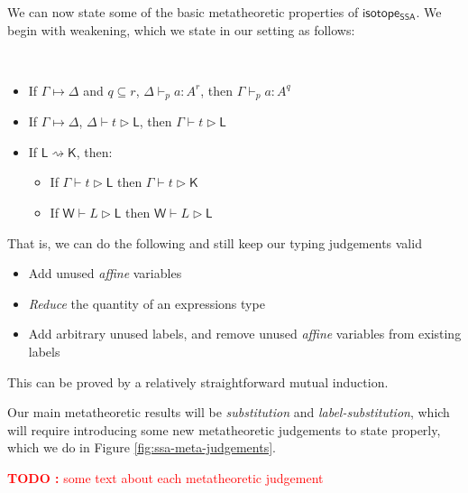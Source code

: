 \documentclass[acmsmall,screen,review]{acmart}
\newcounter{todos}
\newcommand{\TODO}[1]{{
  \stepcounter{todos}
  \begin{center}\large{\textcolor{red}{\textbf{TODO \arabic{todos}:} #1}}\end{center}
}}
\newcommand{\ms}[1]{\ensuremath{\mathsf{#1}}}
\newcommand{\cwk}[2]{#1 \mapsto #2}
\newcommand{\lwk}[2]{#1 \rightsquigarrow #2}
\newcommand{\hasty}[5]{#1 \vdash_{#2} #3: {#4}^{#5}}
\newcommand{\haslb}[3]{#1 \vdash #2 \rhd #3}
\newcommand{\lhaslb}[3]{#1 \vdash #2 \rhd #3}
\newcommand{\isotopessa}{\ms{isotope_{SSA}}}
\begin{document}
We can now state some of the basic metatheoretic properties of \isotopessa. We
begin with weakening, which we state in our setting as follows:
\begin{lemma}[Weakening] \
  \begin{itemize}
    \item If \(\cwk{\Gamma}{\Delta}\) and \(q \subseteq r\),
    \(\hasty{\Delta}{p}{a}{A}{r}\), then \(\hasty{\Gamma}{p}{a}{A}{q}\)
    \item If \(\cwk{\Gamma}{\Delta}\), \(\haslb{\Delta}{t}{\ms{L}}\), then \(\haslb{\Gamma}{t}{\ms{L}}\)
    \item If \(\lwk{\ms{L}}{\ms{K}}\), then:
    \begin{itemize}
      \item If \(\haslb{\Gamma}{t}{\ms{L}}\) then \(\haslb{\Gamma}{t}{\ms{K}}\)
      \item If \(\lhaslb{\ms{W}}{L}{\ms{L}}\) then \(\lhaslb{\ms{W}}{L}{\ms{L}}\)
    \end{itemize}
  \end{itemize}
\end{lemma}
That is, we can do the following and still keep our typing judgements valid
\begin{itemize}
  \item Add unused \textit{affine} variables
  \item \textit{Reduce} the quantity of an expressions type
  \item Add arbitrary unused labels, and remove unused \textit{affine} variables
  from existing labels
\end{itemize}
This can be proved by a relatively straightforward mutual induction.

Our main metatheoretic results will be \textit{substitution} and
\textit{label-substitution}, which will require introducing some new
metatheoretic judgements to state properly, which we do in Figure
\ref{fig:ssa-meta-judgements}.

\TODO{some text about each metatheoretic judgement}
\end{document}
